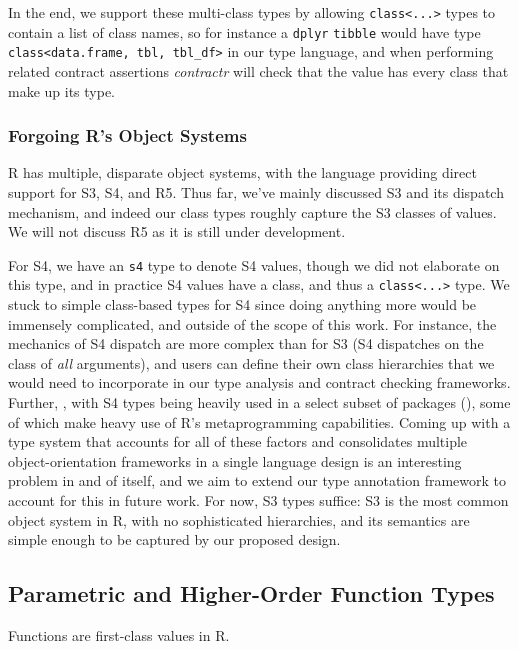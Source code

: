 \documentclass[acmsmall,review,anonymous]{acmart}\settopmatter{printfolios=true,printccs=false,printacmref=false}
\newcommand{\code}[1]{{\lstinline[style=Rin]!#1!}\xspace}
\newcommand{\contractr}{\emph{contractr}\xspace} %
\begin{document}
In the end, we support these multi-class types by allowing \code{class<...>} types to contain a list of class names, so for instance a \code{dplyr} \code{tibble} would have type \code{class<data.frame, tbl, tbl_df>} in our type language, and when performing related contract assertions \contractr will check that the value has every class that make up its type.

%
%
\subsubsection{Forgoing R's Object Systems}

R has multiple, disparate object systems, with the language providing direct
support for S3, S4, and R5.  Thus far, we've mainly discussed S3 and its
dispatch mechanism, and indeed our class types roughly capture the S3
classes of values.  We will not discuss R5 as it is still under
development.

For S4, we have an \code{s4} type to denote S4 values, though we did not elaborate on this type, and in practice S4 values have a class, and thus a \code{class<...>} type.  
We stuck to simple class-based types for S4 since doing anything more would be immensely complicated, and outside of the scope of this work.
For instance, the mechanics of S4 dispatch are more complex than for S3 (S4 dispatches on the class of {\it all} arguments), and users can define their own class hierarchies that we would need to incorporate in our type analysis and contract checking frameworks.  
Further, , with S4 types being heavily used in a select subset of packages (), some of which make heavy use of R's metaprogramming capabilities.  
Coming up with a type system that accounts for all of these factors and consolidates multiple object-orientation frameworks in a single language design is an interesting problem in and of itself, and we aim to extend our type annotation framework to account for this in future work.  
For now, S3 types suffice: S3 is the most common object system in R, with no sophisticated hierarchies, and its semantics are simple enough to be captured by our proposed design.

%
%
%
%
\subsection{Parametric and Higher-Order Function Types}

Functions are first-class values in R.
\end{document}
